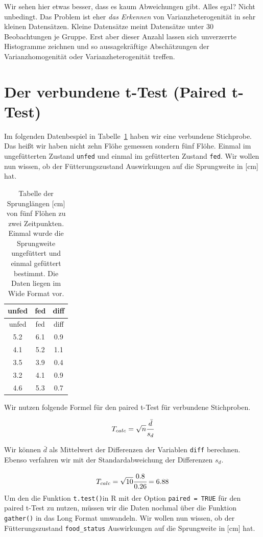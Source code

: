 \documentclass[
  letterpaper,
]{scrbook}
\begin{document}
Wir sehen hier etwas besser, dass es kaum Abweichungen gibt. Alles egal?
Nicht unbedingt. Das Problem ist eher \emph{das Erkennen} von
Varianzheterogenität in sehr kleinen Datensätzen. Kleine Datensätze
meint Datensätze unter 30 Beobachtungen je Gruppe. Erst aber dieser
Anzahl lassen sich unverzerrte Histogramme zeichnen und so
aussagekräftige Abschätzungen der Varianzhomogenität oder
Varianzheterogenität treffen.

\hypertarget{der-verbundene-t-test-paired-t-test}{%
\section{Der verbundene t-Test (Paired
t-Test)}\label{der-verbundene-t-test-paired-t-test}}

Im folgenden Datenbespiel in Tabelle~\ref{tbl-data-ttest-paired} haben
wir eine verbundene Stichprobe. Das heißt wir haben nicht zehn Flöhe
gemessen sondern fünf Flöhe. Einmal im ungefütterten Zustand
\texttt{unfed} und einmal im gefütterten Zustand \texttt{fed}. Wir
wollen nun wissen, ob der Fütterungszustand Auswirkungen auf die
Sprungweite in {[}cm{]} hat.

\hypertarget{tbl-data-ttest-paired}{}
\begin{longtable}[]{@{}ccc@{}}
\caption{\label{tbl-data-ttest-paired}Tabelle der Sprunglängen {[}cm{]}
von fünf Flöhen zu zwei Zeitpunkten. Einmal wurde die Sprungweite
ungefüttert und einmal gefüttert bestimmt. Die Daten liegen im Wide
Format vor.}\tabularnewline
\toprule()
unfed & fed & diff \\
\midrule()
\endfirsthead
\toprule()
unfed & fed & diff \\
\midrule()
\endhead
5.2 & 6.1 & 0.9 \\
4.1 & 5.2 & 1.1 \\
3.5 & 3.9 & 0.4 \\
3.2 & 4.1 & 0.9 \\
4.6 & 5.3 & 0.7 \\
\bottomrule()
\end{longtable}

Wir nutzen folgende Formel für den paired t-Test für verbundene
Stichproben.

\[
T_{calc} = \sqrt{n}\cfrac{\bar{d}}{s_d}
\]

Wir können \(\bar{d}\) als Mittelwert der Differenzen der Variablen
\texttt{diff} berechnen. Ebenso verfahren wir mit der Standardabweichung
der Differenzen \(s_d\).

\[
T_{calc} = \sqrt{10}\cfrac{0.8}{0.26} = 6.88
\] Um den die Funktion \texttt{t.test()}in R mit der Option
\texttt{paired\ =\ TRUE} für den paired t-Test zu nutzen, müssen wir die
Daten nochmal über die Funktion \texttt{gather()} in das Long Format
umwandeln. Wir wollen nun wissen, ob der Fütterungszustand
\texttt{food\_status} Auswirkungen auf die Sprungweite in {[}cm{]} hat.
\end{document}
